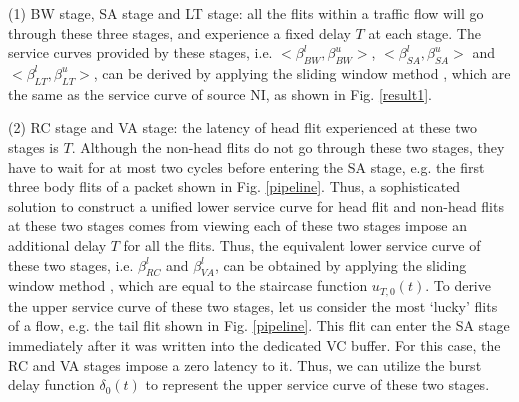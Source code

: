 \documentclass[preprint]{elsarticle}
\begin{document}
(1) BW stage, SA stage and LT stage: all the flits within a traffic flow will go through these three stages, and experience a fixed delay $T$ at each stage. The service curves provided by these stages, i.e. $<\beta^l_{BW},\beta^u_{BW}>$, $<\beta^l_{SA},\beta^u_{SA}>$ and $<\beta^l_{LT},\beta^u_{LT}>$, can be derived by applying the sliding window method \cite{1253607}, which are the same as the service curve of source NI, as shown in Fig. \ref{result1}.

(2) RC stage and VA stage: the latency of head flit experienced at these two stages is $T$. Although the non-head flits do not go through these two stages, they have to wait for at most two cycles before entering the SA stage, e.g. the first three body flits of a packet shown in Fig. \ref{pipeline}. Thus, a sophisticated solution to construct a unified lower service curve for head flit and non-head flits at these two stages comes from viewing each of these two stages impose an additional delay $T$ for all the flits. Thus, the equivalent lower service curve of these two stages, i.e. $\beta^l_{RC}$ and $\beta^l_{VA}$, can be obtained by applying the sliding window method \cite{1253607}, which are equal to the staircase function $u_{T,0}(t)$. To derive the upper service curve of these two stages, let us consider the most `lucky' flits of a flow, e.g. the tail flit shown in Fig. \ref{pipeline}. This flit can enter the SA stage immediately after it was written into the dedicated VC buffer. For this case, the RC and VA stages impose a zero latency to it. Thus, we can utilize the burst delay function $\delta_0(t)$ to represent the upper service curve of these two stages.
\end{document}
